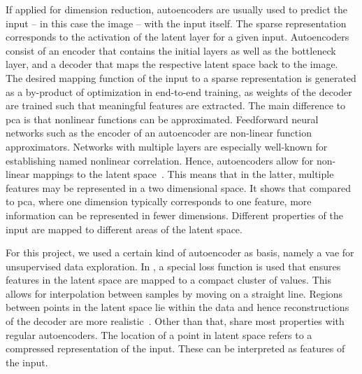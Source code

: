 If applied for dimension reduction, autoencoders are usually used to predict the input -- in this case the image -- with the input itself. The sparse representation corresponds to the activation of the latent layer for a given input. Autoencoders consist of an encoder that contains the initial layers as well as the bottleneck layer, and a decoder that maps the respective latent space back to the image. The desired mapping function of the input to a sparse representation is generated as a by-product of optimization in end-to-end training, as weights of the decoder are trained such that meaningful features are extracted. The main difference to \acrshort{pca} is that nonlinear functions can be approximated. Feedforward neural networks such as the encoder of an autoencoder are non-linear function approximators. Networks with multiple layers are especially well-known for establishing named nonlinear correlation. Hence, autoencoders allow for non-linear mappings to the latent space~\citep{kramer1991nonlinear}. This means that in the latter, multiple features may be represented in a two dimensional space. It shows that compared to \acrshort{pca}, where one dimension typically corresponds to one feature, more information can be represented in fewer dimensions. Different properties of the input are mapped to different areas of the latent space.

\bigskip
For this project, we used a certain kind of autoencoder as basis, namely a \acrfull{vae} for unsupervised data exploration. In , a special loss function is used that ensures features in the latent space are mapped to a compact cluster of values. This allows for interpolation between samples by moving on a straight line. Regions between points in the latent space lie within the data and hence reconstructions of the decoder are more realistic~\citep{keras2020vae}. Other than that,  share most properties with regular autoencoders. The location of a point in latent space refers to a compressed representation of the input. These can be interpreted as features of the input.

